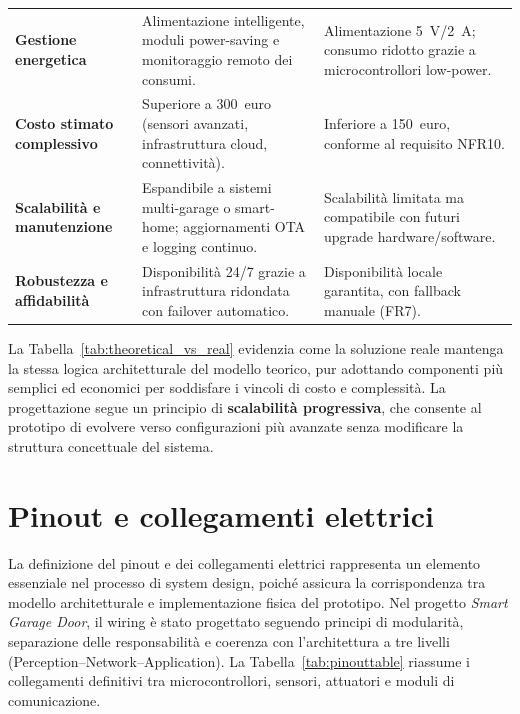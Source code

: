 \begin{minipage}{0.85\textwidth}
\begin{tabular}{p{3.2cm} p{5cm} p{5cm}}
\textbf{Gestione energetica} &
Alimentazione intelligente, moduli power-saving e monitoraggio remoto dei consumi. &
Alimentazione 5~V/2~A; consumo ridotto grazie a microcontrollori low-power. \\

\textbf{Costo stimato complessivo} &
Superiore a 300~euro (sensori avanzati, infrastruttura cloud, connettività). &
Inferiore a 150~euro, conforme al requisito NFR10. \\

\textbf{Scalabilità e manutenzione} &
Espandibile a sistemi multi-garage o smart-home; aggiornamenti OTA e logging continuo. &
Scalabilità limitata ma compatibile con futuri upgrade hardware/software. \\

\textbf{Robustezza e affidabilità} &
Disponibilità 24/7 grazie a infrastruttura ridondata con failover automatico. &
Disponibilità locale garantita, con fallback manuale (FR7). \\

\bottomrule
\end{tabular}
\label{tab:theoretical_vs_real}
\end{minipage}





La Tabella~\ref{tab:theoretical_vs_real} evidenzia come la soluzione reale mantenga la stessa logica architetturale del modello teorico, pur adottando componenti più semplici ed economici per soddisfare i vincoli di costo e complessità. La progettazione segue un principio di \textbf{scalabilità progressiva}, che consente al prototipo di evolvere verso configurazioni più avanzate senza modificare la struttura concettuale del sistema.

\section{Pinout e collegamenti elettrici}

La definizione del pinout e dei collegamenti elettrici rappresenta un elemento essenziale nel processo di system design, poiché assicura la corrispondenza tra modello architetturale e implementazione fisica del prototipo.
Nel progetto \textit{Smart Garage Door}, il wiring è stato progettato seguendo principi di modularità, separazione delle responsabilità e coerenza con l’architettura a tre livelli (Perception–Network–Application).
La Tabella~\ref{tab:pinouttable} riassume i collegamenti definitivi tra microcontrollori, sensori, attuatori e moduli di comunicazione.

